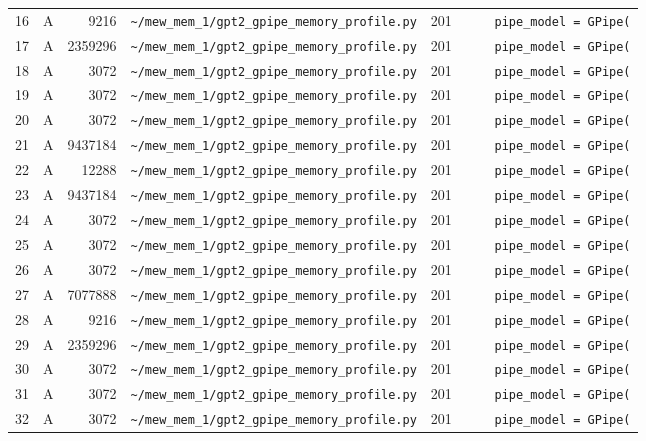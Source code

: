 \documentclass{article}
\begin{document}
\begin{longtable}{r l r p{6.5cm} r p{7.0cm}}
16 & A & 9216 & \lstinline|~/mew_mem_1/gpt2_gpipe_memory_profile.py| & 201 & \lstinline|    pipe_model = GPipe(| \\
17 & A & 2359296 & \lstinline|~/mew_mem_1/gpt2_gpipe_memory_profile.py| & 201 & \lstinline|    pipe_model = GPipe(| \\
18 & A & 3072 & \lstinline|~/mew_mem_1/gpt2_gpipe_memory_profile.py| & 201 & \lstinline|    pipe_model = GPipe(| \\
19 & A & 3072 & \lstinline|~/mew_mem_1/gpt2_gpipe_memory_profile.py| & 201 & \lstinline|    pipe_model = GPipe(| \\
20 & A & 3072 & \lstinline|~/mew_mem_1/gpt2_gpipe_memory_profile.py| & 201 & \lstinline|    pipe_model = GPipe(| \\
21 & A & 9437184 & \lstinline|~/mew_mem_1/gpt2_gpipe_memory_profile.py| & 201 & \lstinline|    pipe_model = GPipe(| \\
22 & A & 12288 & \lstinline|~/mew_mem_1/gpt2_gpipe_memory_profile.py| & 201 & \lstinline|    pipe_model = GPipe(| \\
23 & A & 9437184 & \lstinline|~/mew_mem_1/gpt2_gpipe_memory_profile.py| & 201 & \lstinline|    pipe_model = GPipe(| \\
24 & A & 3072 & \lstinline|~/mew_mem_1/gpt2_gpipe_memory_profile.py| & 201 & \lstinline|    pipe_model = GPipe(| \\
25 & A & 3072 & \lstinline|~/mew_mem_1/gpt2_gpipe_memory_profile.py| & 201 & \lstinline|    pipe_model = GPipe(| \\
26 & A & 3072 & \lstinline|~/mew_mem_1/gpt2_gpipe_memory_profile.py| & 201 & \lstinline|    pipe_model = GPipe(| \\
27 & A & 7077888 & \lstinline|~/mew_mem_1/gpt2_gpipe_memory_profile.py| & 201 & \lstinline|    pipe_model = GPipe(| \\
28 & A & 9216 & \lstinline|~/mew_mem_1/gpt2_gpipe_memory_profile.py| & 201 & \lstinline|    pipe_model = GPipe(| \\
29 & A & 2359296 & \lstinline|~/mew_mem_1/gpt2_gpipe_memory_profile.py| & 201 & \lstinline|    pipe_model = GPipe(| \\
30 & A & 3072 & \lstinline|~/mew_mem_1/gpt2_gpipe_memory_profile.py| & 201 & \lstinline|    pipe_model = GPipe(| \\
31 & A & 3072 & \lstinline|~/mew_mem_1/gpt2_gpipe_memory_profile.py| & 201 & \lstinline|    pipe_model = GPipe(| \\
32 & A & 3072 & \lstinline|~/mew_mem_1/gpt2_gpipe_memory_profile.py| & 201 & \lstinline|    pipe_model = GPipe(| \\

\end{longtable}
\end{document}
